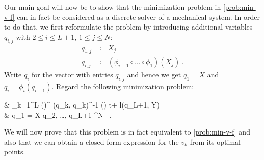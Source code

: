 Our main goal will now be to show that the minimization problem in \cref{prob:min-v-f} can in fact be considered as a discrete solver of a mechanical system.
In order to do that, we first reformulate the problem by introducing additional variables $q_{i,j}$ with $2 \leq i \leq L+1$, $1 \leq j \leq N$:
\begin{align}
	q_{1, j} &\coloneqq X_j \, \\
	q_{i, j} &\coloneqq (\phi_{i-1} \circ \ldots \circ \phi_1) (X_j) \ .
\end{align}
Write $q_i$ for the vector with entries $q_{i,j}$ and hence we get $q_1 = X$ and $q_i = \phi_i(q_{i-1})$.
Regard the following minimization problem:
\begin{problem}
	\label{prob:min-q}
	\begin{cases}
		 & \nu \cdot {} \sum_{k=1}^{L} \left(\right)^ \bGamma(q_k, q_k)^{-1} \left(\right) \Delta t+ l(q_{L+1}, Y) \\
		 & q_1 = X  q_2, \ldots, q_{L+1} \in \cX^N \ .
	\end{cases}
\end{problem}
We will now prove that this problem is in fact equivalent to \cref{prob:min-v-f} and also that we can obtain a closed form expression for the $v_k$ from its optimal points.

